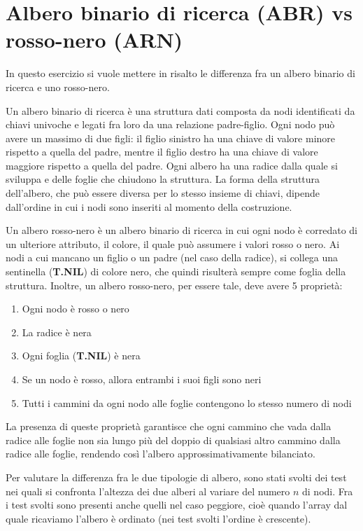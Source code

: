 \documentclass[a4paper, 11pt]{article}
\begin{document}
\section*{Albero binario di ricerca (ABR) vs rosso-nero (ARN)}
\vspace{0,4 cm}

In questo esercizio si vuole mettere in risalto le differenza fra un albero binario di ricerca e uno rosso-nero.

\vspace{0,5 cm} 
Un albero binario di ricerca è una struttura dati composta da nodi identificati da chiavi univoche e legati fra loro da una relazione padre-figlio. Ogni nodo può avere un massimo di due figli: il figlio sinistro ha una chiave di valore minore rispetto a quella del padre, mentre il figlio destro ha una chiave di valore maggiore rispetto a quella del padre. Ogni albero ha una radice dalla quale si sviluppa e delle foglie che chiudono la struttura.
La forma della struttura dell'albero, che può essere diversa per lo stesso insieme di chiavi, dipende dall'ordine in cui i nodi sono inseriti al momento della costruzione.

\vspace{0,5 cm}
Un albero rosso-nero è un albero binario di ricerca in cui ogni nodo è corredato di un ulteriore attributo, il colore, il quale può assumere i valori rosso o nero. Ai nodi a cui mancano un figlio o un padre (nel caso della radice), si collega una sentinella (\textbf{T.NIL}) di colore nero, che quindi risulterà sempre come foglia della struttura. Inoltre, un albero rosso-nero, per essere tale, deve avere 5 proprietà:
\begin{enumerate}
\item Ogni nodo è rosso o nero
\item La radice è nera
\item Ogni foglia (\textbf{T.NIL}) è nera
\item Se un nodo è rosso, allora entrambi i suoi figli sono neri
\item Tutti i cammini da ogni nodo alle foglie contengono lo stesso numero di nodi
\end{enumerate}
La presenza di queste proprietà garantisce che ogni cammino che vada dalla radice alle foglie non sia lungo
più del doppio di qualsiasi altro cammino dalla radice alle foglie, rendendo così l'albero approssimativamente bilanciato.

\vspace{0,5 cm}
Per valutare la differenza fra le due tipologie di albero, sono stati svolti dei test nei quali si confronta l'altezza dei due alberi al variare del numero $n$ di nodi. Fra i test svolti sono presenti anche quelli nel caso peggiore, cioè quando l'array dal quale ricaviamo l'albero è ordinato (nei test svolti l'ordine è crescente).
\end{document}
